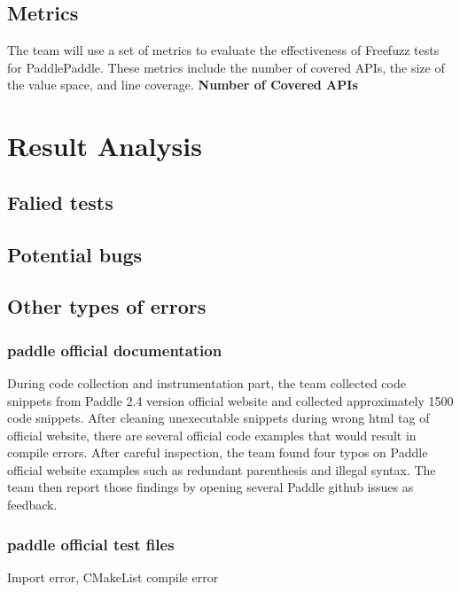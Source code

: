 \documentclass[sigconf]{acmart}
\begin{document}
  \subsection{Metrics}
  The team will use a set of metrics to evaluate the effectiveness of Freefuzz tests for PaddlePaddle. 
  These metrics include the number of covered APIs, the size of the value space, and line coverage.
  \textbf{Number of Covered APIs}

  \section{Result Analysis}
  \subsection{Falied tests}
  \subsection{Potential bugs}
  \subsection{Other types of errors}
  \subsubsection{paddle official documentation}
  During code collection and instrumentation part, the team collected code snippets from Paddle 2.4 version 
  official website and collected approximately 1500 code snippets. After cleaning unexecutable snippets during wrong 
  html tag of official website, there are several official code examples that would result in compile errors. After careful inspection,
   the team found four typos on Paddle official website examples such as redundant parenthesis and illegal syntax. 
   The team then report those findings by opening several Paddle github issues as feedback.
  \subsubsection{paddle official test files}
  Import error, CMakeList compile error
\end{document}
